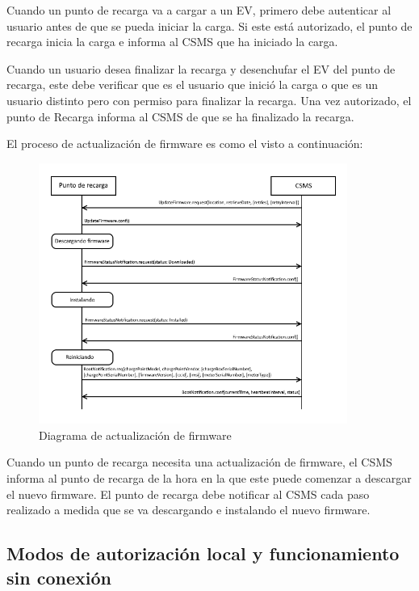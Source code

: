 \documentclass[12pt,a4paper,onecolumn,oneside]{report}
\begin{document}
Cuando un punto de recarga va a cargar a un EV, primero debe autenticar al usuario antes de que se pueda iniciar la carga. Si este está autorizado, el punto de recarga inicia la carga e informa al CSMS que ha iniciado la carga.

Cuando un usuario desea finalizar la recarga y desenchufar el EV del punto de recarga, este debe verificar que es el usuario que inició la carga o que es un usuario distinto pero con permiso para finalizar la recarga. Una vez autorizado, el punto de Recarga informa al CSMS de que se ha finalizado la recarga.

El proceso de actualización de firmware es como el visto a continuación:

\begin{figure}[H] 
\centering
  \includegraphics[width=0.9\textwidth]{figuras/diagramaactualizacionfirmware.png}
  \caption[Diagrama de actualización de firmware]{Diagrama de actualización de firmware\\
  }
  \label{fig:diagramaactualizacionfirmware}
\end{figure}

Cuando un punto de recarga necesita una actualización de firmware, el CSMS informa al punto de recarga de la hora en la que este puede comenzar a descargar el nuevo firmware. El punto de recarga debe notificar al CSMS cada paso realizado a medida que se va descargando e instalando el nuevo firmware.

\subsection{Modos de autorización local y funcionamiento sin conexión}
\label{Modos de autorización local y funcionamiento sin conexión}
\end{document}
